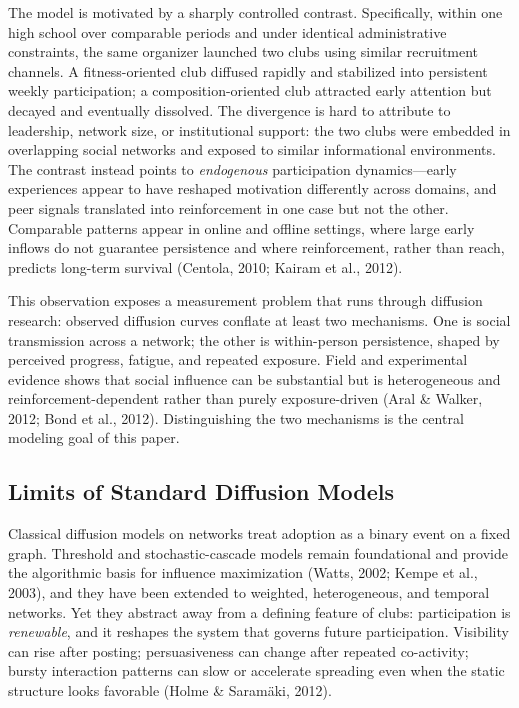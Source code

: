 \documentclass[11pt]{article}
\begin{document}
The model is motivated by a sharply controlled contrast. Specifically, within one high school over comparable periods and under identical administrative constraints, the same organizer launched two clubs using similar recruitment channels. A fitness-oriented club diffused rapidly and stabilized into persistent weekly participation; a composition-oriented club attracted early attention but decayed and eventually dissolved. The divergence is hard to attribute to leadership, network size, or institutional support: the two clubs were embedded in overlapping social networks and exposed to similar informational environments. The contrast instead points to \emph{endogenous} participation dynamics---early experiences appear to have reshaped motivation differently across domains, and peer signals translated into reinforcement in one case but not the other. Comparable patterns appear in online and offline settings, where large early inflows do not guarantee persistence and where reinforcement, rather than reach, predicts long-term survival (Centola, 2010; Kairam et al., 2012).

This observation exposes a measurement problem that runs through diffusion research: observed diffusion curves conflate at least two mechanisms. One is social transmission across a network; the other is within-person persistence, shaped by perceived progress, fatigue, and repeated exposure. Field and experimental evidence shows that social influence can be substantial but is heterogeneous and reinforcement-dependent rather than purely exposure-driven (Aral \& Walker, 2012; Bond et al., 2012). Distinguishing the two mechanisms is the central modeling goal of this paper.

\subsection{Limits of Standard Diffusion Models}
Classical diffusion models on networks treat adoption as a binary event on a fixed graph. Threshold and stochastic-cascade models remain foundational and provide the algorithmic basis for influence maximization (Watts, 2002; Kempe et al., 2003), and they have been extended to weighted, heterogeneous, and temporal networks. Yet they abstract away from a defining feature of clubs: participation is \emph{renewable}, and it reshapes the system that governs future participation. Visibility can rise after posting; persuasiveness can change after repeated co-activity; bursty interaction patterns can slow or accelerate spreading even when the static structure looks favorable (Holme \& Saram\"aki, 2012).
\end{document}
